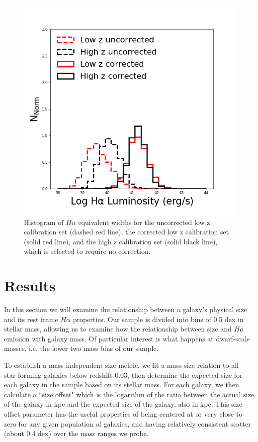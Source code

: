 \documentclass[iop]{emulateapj}
\begin{document}
\begin{figure}
	\centering
	\includegraphics[width=1 \columnwidth]{hist_9_5.png}
	\caption{Histogram of $H\alpha$ equivalent widths for the uncorrected low z calibration set (dashed red line), the corrected low z calibration set (solid red line), and the high z calibration set (solid black line), which is selected to require no correction.}
     \label{fig:hist}

\end{figure}



\section{Results}
\label{sec:results}

In this section we will examine the relationship between a galaxy's physical size and its rest frame $H\alpha$ properties. Our sample is divided into bins of 0.5 dex in stellar mass, allowing us to examine how the relationship between size and $H\alpha$ emission with galaxy mass. Of particular interest is what happens at dwarf-scale masses, i.e. the lower two mass bins of our sample.

To establish a mass-independent size metric, we fit a mass-size relation to all star-forming galaxies below redshift 0.03, then determine the expected size for each galaxy in the sample based on its stellar mass. For each galaxy, we then calculate a ``size offset" which is the logarithm of the ratio between the actual size of the galaxy in kpc and the expected size of the galaxy, also in kpc. This size offset parameter has the useful properties of being centered at or very close to zero for any given population of galaxies, and having relatively consistent scatter (about 0.4 dex) over the mass ranges we probe.
\end{document}
